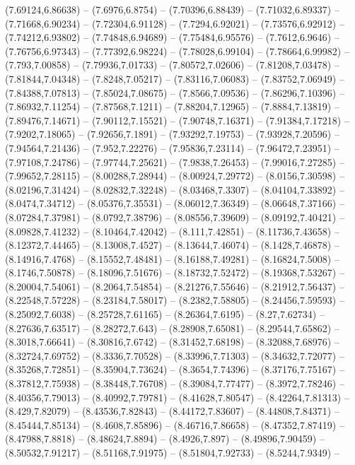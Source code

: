 {(7.69124,6.86638) -- (7.6976,6.8754) -- (7.70396,6.88439) -- (7.71032,6.89337) -- (7.71668,6.90234) -- (7.72304,6.91128) -- (7.7294,6.92021) -- (7.73576,6.92912) -- (7.74212,6.93802) -- (7.74848,6.94689) -- (7.75484,6.95576) -- (7.7612,6.9646) --
(7.76756,6.97343) -- (7.77392,6.98224) -- (7.78028,6.99104) -- (7.78664,6.99982) -- (7.793,7.00858) -- (7.79936,7.01733) -- (7.80572,7.02606) -- (7.81208,7.03478) -- (7.81844,7.04348) -- (7.8248,7.05217) -- (7.83116,7.06083) -- (7.83752,7.06949) --
(7.84388,7.07813) -- (7.85024,7.08675) -- (7.8566,7.09536) -- (7.86296,7.10396) -- (7.86932,7.11254) -- (7.87568,7.1211) -- (7.88204,7.12965) -- (7.8884,7.13819) -- (7.89476,7.14671) -- (7.90112,7.15521) -- (7.90748,7.16371) -- (7.91384,7.17218) --
(7.9202,7.18065) -- (7.92656,7.1891) -- (7.93292,7.19753) -- (7.93928,7.20596) -- (7.94564,7.21436) -- (7.952,7.22276) -- (7.95836,7.23114) -- (7.96472,7.23951) -- (7.97108,7.24786) -- (7.97744,7.25621) -- (7.9838,7.26453) -- (7.99016,7.27285) --
(7.99652,7.28115) -- (8.00288,7.28944) -- (8.00924,7.29772) -- (8.0156,7.30598) -- (8.02196,7.31424) -- (8.02832,7.32248) -- (8.03468,7.3307) -- (8.04104,7.33892) -- (8.0474,7.34712) -- (8.05376,7.35531) -- (8.06012,7.36349) -- (8.06648,7.37166) --
(8.07284,7.37981) -- (8.0792,7.38796) -- (8.08556,7.39609) -- (8.09192,7.40421) -- (8.09828,7.41232) -- (8.10464,7.42042) -- (8.111,7.42851) -- (8.11736,7.43658) -- (8.12372,7.44465) -- (8.13008,7.4527) -- (8.13644,7.46074) -- (8.1428,7.46878) --
(8.14916,7.4768) -- (8.15552,7.48481) -- (8.16188,7.49281) -- (8.16824,7.5008) -- (8.1746,7.50878) -- (8.18096,7.51676) -- (8.18732,7.52472) -- (8.19368,7.53267) -- (8.20004,7.54061) -- (8.2064,7.54854) -- (8.21276,7.55646) -- (8.21912,7.56437) --
(8.22548,7.57228) -- (8.23184,7.58017) -- (8.2382,7.58805) -- (8.24456,7.59593) -- (8.25092,7.6038) -- (8.25728,7.61165) -- (8.26364,7.6195) -- (8.27,7.62734) -- (8.27636,7.63517) -- (8.28272,7.643) -- (8.28908,7.65081) -- (8.29544,7.65862) --
(8.3018,7.66641) -- (8.30816,7.6742) -- (8.31452,7.68198) -- (8.32088,7.68976) -- (8.32724,7.69752) -- (8.3336,7.70528) -- (8.33996,7.71303) -- (8.34632,7.72077) -- (8.35268,7.72851) -- (8.35904,7.73624) -- (8.3654,7.74396) -- (8.37176,7.75167) --
(8.37812,7.75938) -- (8.38448,7.76708) -- (8.39084,7.77477) -- (8.3972,7.78246) -- (8.40356,7.79013) -- (8.40992,7.79781) -- (8.41628,7.80547) -- (8.42264,7.81313) -- (8.429,7.82079) -- (8.43536,7.82843) -- (8.44172,7.83607) -- (8.44808,7.84371) --
(8.45444,7.85134) -- (8.4608,7.85896) -- (8.46716,7.86658) -- (8.47352,7.87419) -- (8.47988,7.8818) -- (8.48624,7.8894) -- (8.4926,7.897) -- (8.49896,7.90459) -- (8.50532,7.91217) -- (8.51168,7.91975) -- (8.51804,7.92733) -- (8.5244,7.9349) --
}
